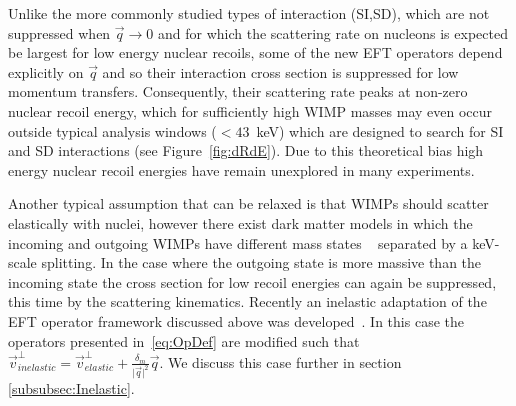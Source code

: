 	    Unlike the more commonly studied types of interaction (SI,SD), which are not suppressed when $\vec{q} \rightarrow 0$ and for which the scattering rate on nucleons is expected be largest for low energy nuclear recoils, some of the new EFT operators depend explicitly on $\vec{q}$ and so their interaction cross section is suppressed for low momentum transfers. Consequently, their scattering rate peaks at non-zero nuclear recoil energy, which for sufficiently high WIMP masses may even occur outside typical analysis windows ($< 43$~keV) which are designed to search for SI and SD interactions (see Figure~\ref{fig:dRdE}). Due to this theoretical bias high energy nuclear recoil energies have remain unexplored in many experiments.
	    
	    Another typical assumption that can be relaxed is that WIMPs should scatter elastically with nuclei, however there exist dark matter models in which the incoming and outgoing WIMPs have different mass states ~\cite{InelasticIntro} separated by a keV-scale splitting. In the case where the outgoing state is more massive than the incoming state the cross section for low recoil energies can again be suppressed, this time by the scattering kinematics. Recently an inelastic adaptation of the EFT operator framework discussed above was developed~\cite{InelasticMath}. In this case the operators presented in~\ref{eq:OpDef} are modified such that $\vec{v}^\perp_{inelastic} = \vec{v}^\perp_{elastic} +\frac{\delta_m}{\vert{\vec{q}}\vert^2}\vec{q}$. We discuss this case further in section \ref{subsubsec:Inelastic}.
	    
